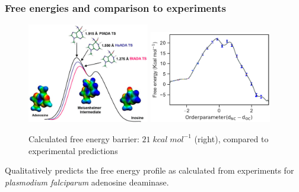 \documentclass{beamer}
\begin{document}
\begin{frame}
\frametitle{Free energies and comparison to experiments}
\begin{figure}
   \includegraphics[width=0.475\textwidth]{figures/ada-exp.png}
   \hfill
   \includegraphics[width=0.475\textwidth]{figures/ada-fenergy.pdf}
\caption{Calculated free energy barrier: $21\;kcal\;mol^{-1}$ (right), compared to experimental predictions}
\end{figure}
Qualitatively predicts the free energy profile as calculated from 
experiments for \textit{plasmodium falciparum} adenosine deaminase.
\end{frame}
\end{document}
